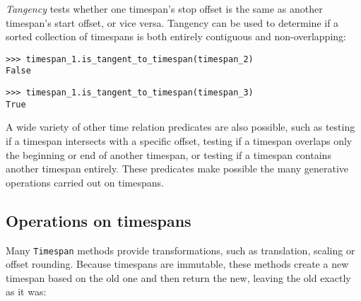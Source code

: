 \noindent \emph{Tangency} tests whether one timespan's stop offset is the same
as another timespan's start offset, or vice versa. Tangency can be used to
determine if a sorted collection of timespans is both entirely contiguous and
non-overlapping:

\begin{comment}
<abjad>
timespan_1.is_tangent_to_timespan(timespan_2)
timespan_1.is_tangent_to_timespan(timespan_3)
</abjad>
\end{comment}

\begin{abjadbookoutput}
\begin{singlespacing}
\vspace{-0.5\baselineskip}
\begin{verbatim}
>>> timespan_1.is_tangent_to_timespan(timespan_2)
False
\end{verbatim}
\begin{verbatim}
>>> timespan_1.is_tangent_to_timespan(timespan_3)
True
\end{verbatim}
\end{singlespacing}
\end{abjadbookoutput}

\noindent A wide variety of other time relation predicates are also possible,
such as testing if a timespan intersects with a specific offset, testing if a
timespan overlaps only the beginning or end of another timespan, or testing if
a timespan contains another timespan entirely. These predicates make possible
the many generative operations carried out on timespans.

\subsection{Operations on timespans} %
\label{ssec:operations-on-timespans}

Many \texttt{Timespan} methods provide transformations, such as translation,
scaling or offset rounding. Because timespans are immutable, these methods
create a new timespan based on the old one and then return the new, leaving
the old exactly as it was:

\begin{comment}
<abjad>
timespan = timespantools.Timespan(0, 15)
timespan.translate(3)
timespan.scale(3)
timespan.round_offsets(2)
</abjad>
\end{comment}

